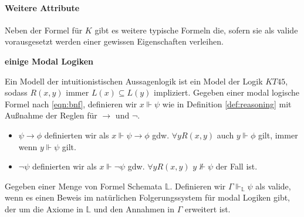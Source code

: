 \paragraph{Weitere Attribute} %
\label{par:weitere_attribute} 

Neben der Formel für $K$ gibt es weitere typische Formeln die, sofern sie als valide vorausgesetzt werden einer \NML gewissen Eigenschaften verleihen.


\textbf{einige Modal Logiken}



\begin{definition}
	Ein Modell der intuitionistischen Aussagenlogik ist ein Model \modelFormel der Logik $KT45$, sodass $R(x,y)$ immer $L(x) \subseteq L(y)$ impliziert.
	Gegeben einer modal logische Formel nach \eqref{eqn:bnf}, definieren wir $x \Vdash \psi$ wie in Definition \eqref{def:reasoning} mit Außnahme der Reglen für $\rightarrow$ und $\neg$.
	\begin{itemize}
		\item $\psi \rightarrow \phi$ definierten wir als $x \Vdash \psi \rightarrow \phi$ gdw. $\forall y R(x,y)$ auch $y \Vdash \phi$ gilt, immer wenn $y \Vdash \psi$ gilt.
		\item $\neg \psi$ definierten wir als $x \Vdash \neg \psi$ gdw. $\forall y R(x,y)$ $y \nVdash \psi$ der Fall ist.
	\end{itemize}
\end{definition}
\cite[S.328]{huth2004logic}

\begin{definition}
	Gegeben einer Menge von Formel Schemata $\mathds{L}$.
	Definieren wir $\Gamma \Vdash_\mathds{L} \psi$ als valide, wenn es einen Beweis im natürlichen Folgerungssystem für modal Logiken gibt, der um die Axiome in $\mathds{L}$ und den Annahmen in $\Gamma$ erweitert ist.
\end{definition}
\cite[S.330]{huth2004logic}




